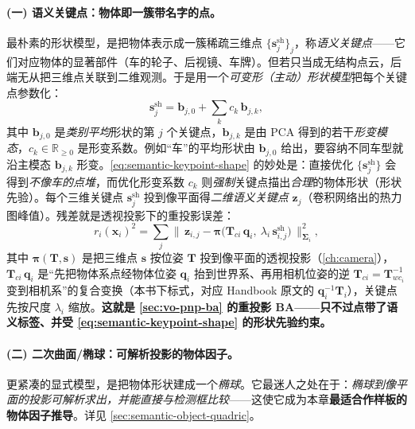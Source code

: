 \paragraph{(一) 语义关键点：物体即一簇带名字的点。}
最朴素的形状模型，是把物体表示成一簇稀疏三维点 $\{\mathbf{s}^{\mathrm{sh}}_j\}_j$，称\emph{语义关键点}——它们对应物体的显著部件（车的轮子、后视镜、车牌）。但若只当成无结构点云，后端无从把三维点关联到二维观测。于是用一个\emph{可变形（主动）形状模型}\cite{cootes1995active}把每个关键点参数化：
\begin{equation}
  \mathbf{s}^{\mathrm{sh}}_j=\mathbf{b}_{j,0}+\sum_k c_k\,\mathbf{b}_{j,k},
  \label{eq:semantic-keypoint-shape}
\end{equation}
其中 $\mathbf{b}_{j,0}$ 是\emph{类别平均}形状的第 $j$ 个关键点，$\mathbf{b}_{j,k}$ 是由 PCA 得到的若干\emph{形变模态}，$c_k\in\mathbb{R}_{\ge0}$ 是形变系数\cite{pavlakos2017semantickeypoints}。例如“车”的平均形状由 $\mathbf{b}_{j,0}$ 给出，要容纳不同车型就沿主模态 $\mathbf{b}_{j,k}$ 形变。\cref{eq:semantic-keypoint-shape} 的妙处是：直接优化 $\{\mathbf{s}^{\mathrm{sh}}_j\}$ 会得到\emph{不像车的点堆}，而优化形变系数 $c_k$ 则\emph{强制}关键点描出\emph{合理}的物体形状（形状先验）。每个三维关键点 $\mathbf{s}^{\mathrm{sh}}_j$ 投到像平面得\emph{二维语义关键点} $\mathbf{z}_j$（卷积网络出的热力图峰值\cite{pavlakos2017semantickeypoints}）。残差就是透视投影下的重投影误差：
\begin{equation}
  r_i(\mathbf{x}_i)^2=\sum_j\big\|\,\mathbf{z}_{i,j}-\boldsymbol\pi\!\big(\mathbf{T}_{ci}\,\mathbf{q}_i,\ \lambda_i\,\mathbf{s}^{\mathrm{sh}}_{i,j}\big)\,\big\|_{\boldsymbol\Sigma_i}^2,
  \label{eq:semantic-keypoint-residual}
\end{equation}
其中 $\boldsymbol\pi(\mathbf{T},\mathbf{s})$ 是把三维点 $\mathbf{s}$ 按位姿 $\mathbf{T}$ 投到像平面的透视投影（\cref{ch:camera}），$\mathbf{T}_{ci}\,\mathbf{q}_i$ 是“先把物体系点经物体位姿 $\mathbf{q}_i$ 抬到世界系、再用相机位姿的逆 $\mathbf{T}_{ci}=\mathbf{T}_{wc_i}^{-1}$ 变到相机系”的复合变换（本书下标式，对应 Handbook 原文的 $\mathbf{q}_i^{-1}\mathbf{T}_i$），关键点先按尺度 $\lambda_i$ 缩放。\textbf{这就是 \cref{sec:vo-pnp-ba} 的重投影 BA——只不过点带了语义标签、并受 \cref{eq:semantic-keypoint-shape} 的形状先验约束。}

\paragraph{(二) 二次曲面/椭球：可解析投影的物体因子。}
更紧凑的显式模型，是把物体形状建成一个\emph{椭球}\cite{nicholson2019quadricslam,rubino2018quadrics}。它最迷人之处在于：\emph{椭球到像平面的投影可解析求出，并能直接与检测框比较}——这使它成为本章\textbf{最适合作样板的物体因子推导}。详见 \cref{sec:semantic-object-quadric}。

